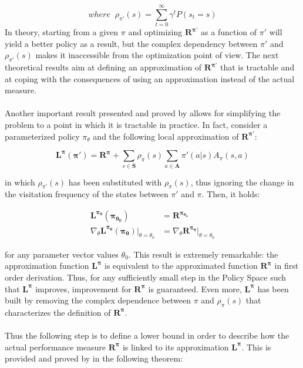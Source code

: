                \[ where \; \;\rho_{\pi'}(s) = \sum_{t=0}^{\infty} \gamma^t P(s_t = s)\]
                \noindent
                In theory, starting from a given $\pi$ and optimizing $\mathbf{R^{\pi'}}$ as a function of $\pi'$ will yield a better policy as a result, but the complex dependency between $\pi'$ and $\rho_{\pi'}(s)$ makes it inaccessible from the optimization point of view. The next theoretical results aim at defining an approximation of $\mathbf{R^{\pi'}}$ that is tractable and at coping with the consequences of using an approximation instead of the actual measure.
                \\\\
                Another important result presented and proved by  allows for simplifying the problem to a point in which it is tractable in practice. In fact, consider a parameterized policy $\pi_\theta$ and the following local approximation of $\mathbf{R^{\pi'}}$:
                
                \begin{definition}
                    \label{def:r_approximated}
                    \[ \mathbf{L^{\pi}(\pi')} = \mathbf{R^{\pi}} + \sum_{s \in \mathbf{S}} \rho_{\pi}(s) \sum_{a \in \mathbf{A}} \pi'(a|s) A_{\pi}(s,a) \]
                \end{definition}
                
                in which $\rho_{\pi'}(s)$ has been substituted with $\rho_{\pi}(s)$, thus ignoring the change in the visitation frequency of the states between $\pi'$ and $\pi$. Then, it holds:
                
                \begin{align}
                    \mathbf{L^{\pi_\theta}(\pi_{\theta_0})} &= \mathbf{R^{\pi_{\theta_0}}}\\
                    \nabla_\theta \mathbf{L^{\pi_\theta}(\pi_\theta)} \biggr\rvert_{\theta = \theta_0} &= \nabla_\theta \mathbf{R^{\pi_\theta}} \biggr\rvert_{\theta = \theta_0}\nonumber
                \end{align}

                for any parameter vector values $\theta_0$. This result is extremely remarkable: the approximation function $\mathbf{L^{\pi}}$ is equivalent to the approximated function $\mathbf{R^{\pi}}$ in first order derivation. Thus, for any sufficiently small step in the Policy Space such that $\mathbf{L^{\pi}}$ improves, improvement for $\mathbf{R^{\pi}}$ is guaranteed. Even more, $\mathbf{L^{\pi}}$ has been built by removing the complex dependence between $\pi$ and $\rho_{\pi}(s)$ that characterizes the definition of $\mathbf{R^{\pi}}$.
                \\\\
                Thus the following step is to define a lower bound in order to describe how the actual performance measure $\mathbf{R^{\pi}}$ is linked to its approximation $\mathbf{L^{\pi}}$. This is provided and proved by  in the following theorem:
                
